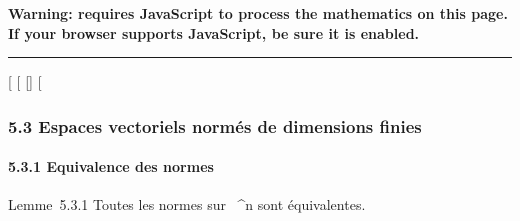 \textbf{Warning: 
requires JavaScript to process the mathematics on this page.\\ If your
browser supports JavaScript, be sure it is enabled.}

\begin{center}\rule{3in}{0.4pt}\end{center}

{[}
{[}
{[}{]}
{[}

\subsubsection{5.3 Espaces vectoriels normés de dimensions finies}

\paragraph{5.3.1 Equivalence des normes}

Lemme~5.3.1 Toutes les normes sur ~^n sont équivalentes.

